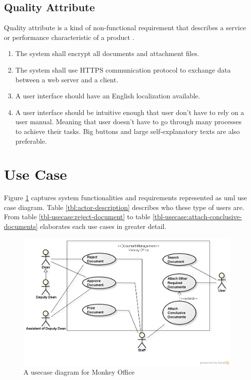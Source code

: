\subsection{Quality Attribute}
Quality attribute is a kind of non-functional requirement that describes a service or performance characteristic of a product \cite{wiegers_2003}.
\begin{enumerate}
	\item The system shall encrypt all documents and attachment files.
	\item The system shall use HTTPS communication protocol to exchange data between a web server and a client.
	\item A user interface should have an English localization available.
	\item A user interface should be intuitive enough that user don't have to rely on a user manual.
	Meaning that user doesn't have to go through many processes to achieve their tasks.
	Big buttons and large self-explanatory texts are also preferable.
\end{enumerate}

\clearpage

\section{Use Case}
\label{section:usecase}
Figure \ref{fig:usecase-diagram} captures system functionalities and requirements represented as \gls{uml} use case diagram.
Table \ref{tbl:actor-description} describes who these type of users are.
From table \ref{tbl-usecase:reject-document} to table \ref{tbl-usecase:attach-conclusive-documents} elaborates each use cases in greater detail.

\begin{figure}
	\centering
	\includegraphics[scale=0.6]{res/software-design/usecase_diagram}
	\caption{A usecase diagram for Monkey Office}
	\label{fig:usecase-diagram}
\end{figure}

